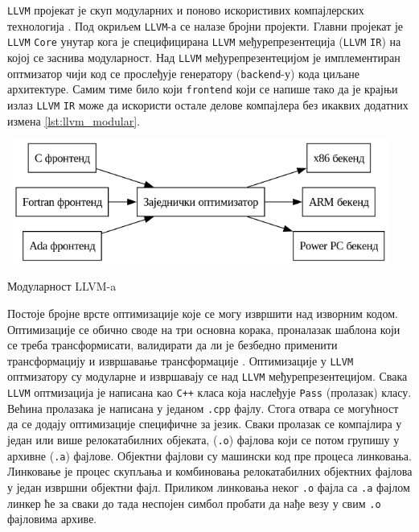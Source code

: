 \verb|LLVM| пројекат је скуп модуларних и поново искористивих компајлерских технологија \cite{llvm}. Под окриљем \verb|LLVM|-а
се налазе бројни пројекти. Главни пројекат је \verb|LLVM| \verb|Core| унутар кога је специфицирана \verb|LLVM|
међурепрезентеција (\verb|LLVM| \verb|IR|) на којој се заснива модуларност. Над \verb|LLVM| међурепрезентецијом
је имплементиран оптмизатор чији код се прослеђује генератору (\verb|backend|-у) кода циљане архитектуре. Самим тиме 
било који \verb|frontend| који се напише тако да је крајњи излаз \verb|LLVM| \verb|IR| може да искористи 
остале делове компајлера без икаквих додатних измена \ref{lst:llvm_modular}.

\begin{listing}[H]
\begin{center}
\includegraphics[width=5in, height=1.6in]{assets/images/modern_compiler_design.png}
\end{center}
\caption{Модуларност LLVM-a}
\label{lst:llvm_modular}
\end{listing}

Постоје бројне врсте оптимизације које се могу извршити над изворним кодом. Оптимизације се обично своде 
на три основна корака, проналазак шаблона који се треба трансформисати, валидирати да ли је безбедно применити 
трансформацију и извршавање трансформације \cite{oss-architecture}. Оптимизације у \verb|LLVM| оптмизатору су модуларне и извршавају 
се над \verb|LLVM| међурепрезентецијом. Свака \verb|LLVM| оптмизација је написана као \verb|C++| класа која 
наслеђује \verb|Pass| (пролазак) класу. Већина пролазака је написана у једаном \verb|.cpp| фајлу.
Стога отвара се могућност да се додају оптимизације специфичне за језик. Сваки пролазак се компајлира у један 
или више релокатабилних објеката, (\verb|.o|) фајлова који се потом групишу у архивне (\verb|.a|) фајлове. Објектни фајлови 
су машински код пре процеса линковања. Линковање је процес скупљања и комбиновања релокатабилних објектних фајлова
у један извршни објектни фајл. Приликом линковања неког \verb|.o| фајла са \verb|.a| фајлом линкер ће 
за сваки до тада неспојен симбол пробати да нађе везу у свим \verb|.o| фајловима архиве.

